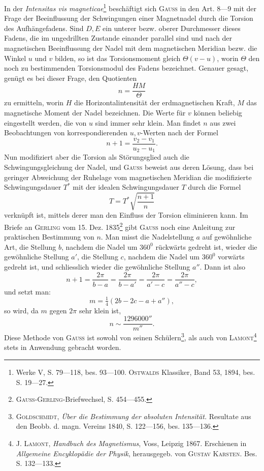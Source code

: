 \clearpage\begingroup{}
\makeatletter\tagsleft@true\let\veqno\@@leqno\makeatother
\renewcommand{\thefootnote}{\arabic{footnote})}\setcounter{footnote}{113}
\begin{center}\end{center}
\noindent\hspace*{\parindent}In der \textit{Intensitas vis magneticae}\footnote{Werke V, S. 79—118, bes. 93—100. \textsc{Ostwalds} Klassiker, Band 53, 1894, bes. S. 19—27.} beschäftigt sich \textsc{Gauss} in den Art.
8—9 mit der Frage der Beeinflussung der Schwingungen einer Magnetnadel
durch die Torsion des Aufhängefadens. Sind \(D,E\) ein unterer bezw. oberer
Durchmesser dieses Fadens, die im ungedrillten Zustande einander parallel
sind und nach der magnetischen Beeinflussung der Nadel mit dem magnetischen
Meridian bezw. die Winkel \(u\) und \(v\) bilden, so ist das Torsionsmoment gleich
\(\Theta(v-u)\), worin \(\Theta\) den noch zu bestimmenden Torsionsmodul des Fadens bezeichnet.
Genauer gesagt, genügt es bei dieser Frage, den Quotienten
\[
n=\frac{HM}{\Theta}
\]
\noindent zu ermitteln, worin \(H\) die Horizontalintensität der erdmagnetischen Kraft, \(M\)
das magnetische Moment der Nadel bezeichnen. Die Werte für \(v\) können
beliebig eingestellt werden, die von \(u\) sind immer sehr klein. Man findet \(n\)
aus zwei Beobachtungen von korrespondierenden \(u,v\)-Werten nach der Formel
\[
n+1=\frac{v_2-v_1}{u_2-u_1}.\tag{4}
\]
\noindent Nun modifiziert aber die Torsion als Störungsglied auch die Schwingungsgleichung
der Nadel, und \textsc{Gauss} beweist aus deren Lösung, dass bei geringer
Abweichung der Ruhelage vom magnetischen Meridian die modifizierte Schwingungsdauer
\(T^*\) mit der idealen Schwingungsdauer \(T\) durch die Formel
\[
T=T^*\sqrt{\frac{n+1}{n}}
\]
\clearpage{}
\noindent verknüpft ist, mittels derer man den Einfluss der Torsion eliminieren kann.
Im Briefe an \textsc{Gerling} vom 15. Dez. 1835\footnote{\textsc{Gauss-Gerling}-Briefwechsel, S. 454—455.} gibt \textsc{Gauss} noch eine Anleitung
zur praktischen Bestimmung von \(n\). Man misst die Nadelstellung \(a\) auf
gewöhnliche Art, die Stellung \(b\), nachdem die Nadel um \(360^0\) rückwärts gedreht
ist, wieder die gewöhnliche Stellung \(a'\), die Stellung \(c\), nachdem die
Nadel um \(360^0\) vorwärts gedreht ist, und schliesslich wieder die gewöhnliche
Stellung \(a''\). Dann ist also
\[
n+1=\frac{2\pi}{b-a}=\frac{2\pi}{b-a'}=\frac{2\pi}{a'-c}=\frac{2\pi}{a''-c},
\]
\noindent und setzt man:
\[
m=\tfrac14(2b-2c-a+a''),
\]
\noindent so wird, da \(m\) gegen \(2\pi\) sehr klein ist,
\[
n\sim\frac{1296000''}{m''}.
\]
\noindent Diese Methode von \textsc{Gauss} ist sowohl von seinen Schülern\footnote{\textsc{Goldschmidt}, \textit{Über die Bestimmung der absoluten Intensität.} Resultate aus den Beobb. d. magn. Vereins 1840, S. 122—156, bes. 135—136.}, als auch von
\textsc{Lamont}\footnote{J. \textsc{Lamont}, \textit{Handbuch des Magnetismus}, Voss, Leipzig 1867. Erschienen in \textit{Allgemeine Encyklopädie der Physik}, herausgegeb. von \textsc{Gustav Karsten}. Bes. S. 132—133.} stets in Anwendung gebracht worden.

